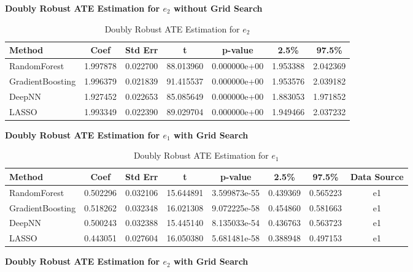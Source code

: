 \documentclass{article}
\begin{document}
\textbf{Doubly Robust ATE Estimation for $e_2$ without Grid Search}

\begin{table}[H]
  \centering
  \renewcommand{\arraystretch}{1.5}
  \begin{tabular}{|l|c|c|c|c|c|c|}
    \hline
    \textbf{Method} & \textbf{Coef} & \textbf{Std Err} & \textbf{t} & \textbf{p-value} & \textbf{2.5\%} & \textbf{97.5\%} \\
    \hline
    RandomForest & 1.997878 & 0.022700 & 88.013960 & 0.000000e+00 & 1.953388 & 2.042369 \\ \hline
    GradientBoosting & 1.996379 & 0.021839 & 91.415537 & 0.000000e+00 & 1.953576 & 2.039182 \\ \hline
    DeepNN & 1.927452 & 0.022653 & 85.085649 & 0.000000e+00 & 1.883053 & 1.971852 \\ \hline
    LASSO & 1.993349 & 0.022390 & 89.029704 & 0.000000e+00 & 1.949466 & 2.037232 \\ \hline
  \end{tabular}
  \caption{Doubly Robust ATE Estimation for $e_2$}
\end{table}

\textbf{Doubly Robust ATE Estimation for $e_1$ with Grid Search}

\begin{table}[H]
  \centering
  \renewcommand{\arraystretch}{1.5}
  \begin{tabular}{|l|c|c|c|c|c|c|c|}
    \hline
    \textbf{Method} & \textbf{Coef} & \textbf{Std Err} & \textbf{t} & \textbf{p-value} & \textbf{2.5\%} & \textbf{97.5\%} & \textbf{Data Source} \\
    \hline
    RandomForest & 0.502296 & 0.032106 & 15.644891 & 3.599873e-55 & 0.439369 & 0.565223 & e1 \\ \hline
    GradientBoosting & 0.518262 & 0.032348 & 16.021308 & 9.072225e-58 & 0.454860 & 0.581663 & e1 \\ \hline
    DeepNN & 0.500243 & 0.032388 & 15.445140 & 8.135033e-54 & 0.436763 & 0.563723 & e1 \\ \hline
    LASSO & 0.443051 & 0.027604 & 16.050380 & 5.681481e-58 & 0.388948 & 0.497153 & e1 \\ \hline
  \end{tabular}
  \caption{Doubly Robust ATE Estimation for $e_1$}
\end{table}

\textbf{Doubly Robust ATE Estimation for $e_2$ with Grid Search}
\end{document}
